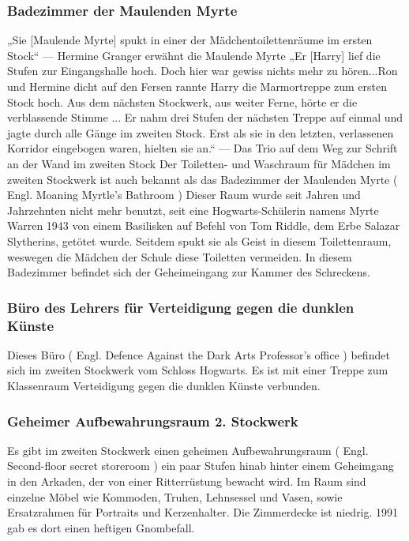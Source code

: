 \documentclass[a4paper, 10pt]{article}
\begin{document}
\subsubsection*{\large Badezimmer der Maulenden Myrte}
„Sie [Maulende Myrte] spukt in einer der Mädchentoilettenräume im ersten Stock“
\vspace{10pt}
\newline
— Hermine Granger erwähnt die Maulende Myrte
\vspace{10pt}
\newline
„Er [Harry] lief die Stufen zur Eingangshalle hoch. Doch hier war gewiss nichts mehr zu hören...Ron und Hermine dicht auf den Fersen rannte Harry die Marmortreppe zum ersten Stock hoch. Aus dem nächsten Stockwerk, aus weiter Ferne, hörte er die verblassende Stimme ... Er nahm drei Stufen der nächsten Treppe auf einmal und jagte durch alle Gänge im zweiten Stock. Erst als sie in den letzten, verlassenen Korridor eingebogen waren, hielten sie an.“
\vspace{10pt}
\newline
— Das Trio auf dem Weg zur Schrift an der Wand im zweiten Stock
\vspace{10pt}
\newline
Der Toiletten- und Waschraum für Mädchen im zweiten Stockwerk ist auch bekannt als das Badezimmer der Maulenden Myrte (  Engl.  Moaning Myrtle's Bathroom ) Dieser Raum wurde seit Jahren und Jahrzehnten nicht mehr benutzt, seit eine Hogwarts-Schülerin namens Myrte Warren 1943 von einem Basilisken auf Befehl von Tom Riddle, dem Erbe Salazar Slytherins, getötet wurde. Seitdem spukt sie als Geist in diesem Toilettenraum, weswegen die Mädchen der Schule diese Toiletten vermeiden.
\vspace{10pt}
\newline
In diesem Badezimmer befindet sich der Geheimeingang zur Kammer des Schreckens.

\subsubsection*{\large Büro des Lehrers für Verteidigung gegen die dunklen Künste}
Dieses Büro (  Engl.  Defence Against the Dark Arts Professor's office ) befindet sich im zweiten Stockwerk vom Schloss Hogwarts. Es ist mit einer Treppe zum Klassenraum Verteidigung gegen die dunklen Künste verbunden.

\subsubsection*{\large Geheimer Aufbewahrungsraum 2. Stockwerk}
Es gibt im zweiten Stockwerk einen geheimen Aufbewahrungsraum (  Engl.  Second-floor secret storeroom ) ein paar Stufen hinab hinter einem Geheimgang in den Arkaden, der von einer Ritterrüstung bewacht wird. Im Raum sind einzelne Möbel wie Kommoden, Truhen, Lehnsessel und Vasen, sowie Ersatzrahmen für Portraits und Kerzenhalter. Die Zimmerdecke ist niedrig. 1991 gab es dort einen heftigen Gnombefall.
\end{document}
